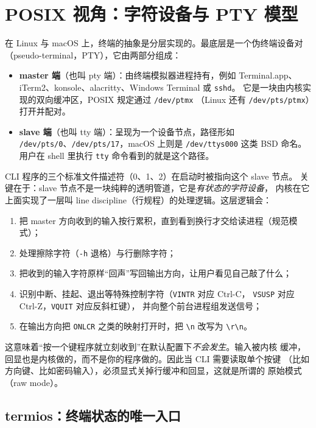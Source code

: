 \documentclass[12pt,a4paper,fontset=fandol]{ctexbook}
\newcommand{\Tp}[1]{\texttt{#1}}
\newcommand{\Short}[1]{\texttt{-#1}}
\begin{document}
\section{POSIX 视角：字符设备与 PTY 模型}

在 Linux 与 macOS 上，终端的抽象是分层实现的。最底层是一个伪终端设备对
（pseudo-terminal，PTY），它由两部分组成：

\begin{itemize}
\item \textbf{master 端}（也叫 pty 端）：由终端模拟器进程持有，例如
      Terminal.app、iTerm2、konsole、alacritty、Windows Terminal 或 \Tp{sshd}。
      它是一块由内核实现的双向缓冲区，POSIX 规定通过 \Tp{/dev/ptmx}
      （Linux 还有 \Tp{/dev/pts/ptmx}）打开并配对。
\item \textbf{slave 端}（也叫 tty 端）：呈现为一个设备节点，路径形如
      \Tp{/dev/pts/0}、\Tp{/dev/pts/17}，macOS 上则是 \Tp{/dev/ttys000}
      这类 BSD 命名。用户在 shell 里执行 \Tp{tty} 命令看到的就是这个路径。
\end{itemize}

CLI 程序的三个标准文件描述符（0、1、2）在启动时被指向这个 slave 节点。
关键在于：slave 节点不是一块纯粹的透明管道，它是\emph{有状态的字符设备}，
内核在它上面实现了一层叫 line discipline（行规程）的处理逻辑。这层逻辑会：

\begin{enumerate}
\item 把 master 方向收到的输入按行累积，直到看到换行才交给读进程（规范模式）；
\item 处理擦除字符（\Short{h} 退格）与行删除字符；
\item 把收到的输入字符原样``回声''写回输出方向，让用户看见自己敲了什么；
\item 识别中断、挂起、退出等特殊控制字符（\Tp{VINTR} 对应 Ctrl-C，
      \Tp{VSUSP} 对应 Ctrl-Z，\Tp{VQUIT} 对应反斜杠键），
      并向整个前台进程组发送信号；
\item 在输出方向把 \Tp{ONLCR} 之类的映射打开时，把 \Tp{\textbackslash n}
      改写为 \Tp{\textbackslash r\textbackslash n}。
\end{enumerate}

这意味着``按一个键程序就立刻收到''在默认配置下\emph{不会发生}。输入被内核
缓冲，回显也是内核做的，而不是你的程序做的。因此当 CLI 需要读取单个按键
（比如方向键、比如密码输入），必须显式关掉行缓冲和回显，这就是所谓的
原始模式（raw mode）。

\subsection{termios：终端状态的唯一入口}
\end{document}
